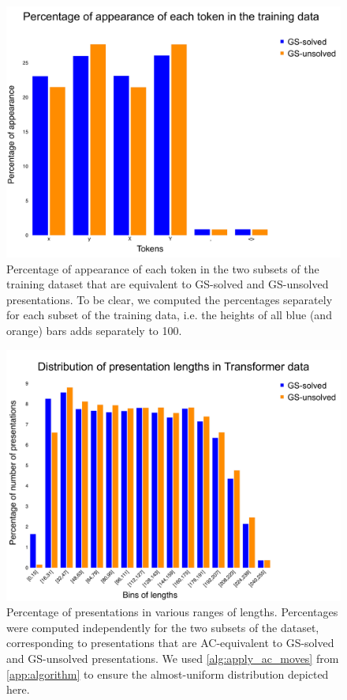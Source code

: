 \begin{figure}
	\centering
	\includegraphics[scale=0.15]{fig/tokens_hist.pdf}
	\caption{Percentage of appearance of each token in the two subsets of the training dataset that are equivalent to GS-solved and GS-unsolved presentations.
	To be clear, we computed the percentages separately for each subset of the training data, i.e. the heights of all blue (and orange) bars adds separately to 100.}
	\label{fig:tokens_hist}
\end{figure}

\begin{figure}
	\centering
	\includegraphics[scale=0.15]{fig/gpt_data_length_distribution.pdf}
	\caption{Percentage of presentations in various ranges of lengths.
	Percentages were computed independently for the two subsets of the dataset, corresponding to presentations that are AC-equivalent to GS-solved and GS-unsolved presentations.
	We used \autoref{alg:apply_ac_moves} from \autoref{app:algorithm} to ensure the almost-uniform distribution depicted here.}
	\label{fig:gpt_data}
\end{figure}

